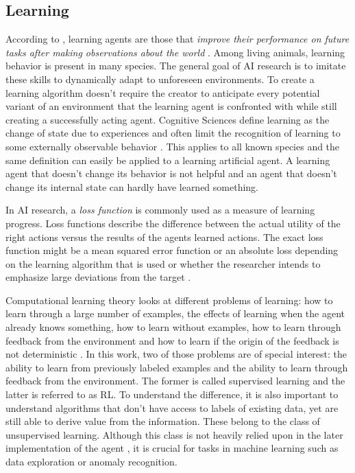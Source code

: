 \subsection{Learning}
\label{sec:learning}

According to \citep{russell2016artificial}, learning agents are those that \emph{improve their performance on future
tasks after making observations about the world} \cite[p.693]{russell2016artificial}. Among living animals, learning
behavior is present in many species. The general goal of \ac{AI} research is to imitate these
skills to dynamically adapt
to unforeseen environments. To create a learning algorithm doesn't require the creator to anticipate every
potential variant of an environment that the learning agent is confronted with while still creating a successfully
acting agent. Cognitive Sciences define learning as the change of state due to experiences and often limit the
recognition of learning to some externally observable behavior \cite[p.96f.]{cognition1999}. This applies to all known
species and the same definition can easily be applied to a learning artificial agent. A learning agent that doesn't
change its behavior is not helpful and an agent that doesn't change its internal state can hardly have learned
something.

In \ac{AI} research, a \emph{loss function} is commonly used as a measure of learning progress. Loss functions describe
the difference between the actual utility of the right actions versus the results of the agents learned actions. The
exact loss function might be a mean squared error function or an absolute loss depending on the learning algorithm that
is used or whether the researcher intends to emphasize large deviations from the target \cite[p.710]{russell2016artificial}.

Computational learning theory looks at different problems of learning: how to learn through a large number of
examples, the effects of learning when the agent already knows something, how to learn without examples, how to learn
through feedback from the environment and how to learn if the origin of the feedback is not deterministic
\citep{russell2016artificial}. In this work, two of those problems are of special interest: the ability to learn from
previously labeled examples and the ability to learn through feedback from the environment. The former is called
supervised learning and the latter is referred to as \acl{RL}. To understand the difference, it is also important to
understand algorithms that don't have access to labels of existing data, yet are still able to derive value from the
information. These belong to the class of unsupervised learning. Although this class is not heavily relied upon in the
later implementation of the agent , it is crucial for tasks in machine learning such as data exploration or anomaly
recognition.

